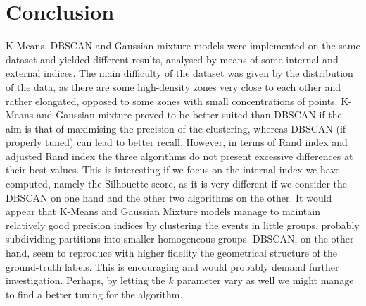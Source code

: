 \documentclass[a4paper]{article}
\begin{document}
 	\section{Conclusion}
 	K-Means, DBSCAN and Gaussian mixture models were implemented on the same dataset and yielded different results, analysed by means of some internal and external indices. The main difficulty of the dataset was given by the distribution of the data, as there are some high-density zones very close to each other and rather elongated, opposed to some zones with small concentrations of points.  K-Means and Gaussian mixture proved to be better suited than DBSCAN if the aim is that of maximising the precision of the clustering, whereas DBSCAN (if properly tuned) can lead to better recall. However, in terms of Rand index and adjusted Rand index the three algorithms do not present excessive differences at their best values. This is interesting if we focus on the internal index we have computed, namely the Silhouette score, as it is very different if we consider the DBSCAN on one hand and the other two algorithms on the other. It would appear that K-Means and Gaussian Mixture models manage to maintain relatively good precision indices by clustering the events in little groups, probably subdividing partitions into smaller homogeneous groups. DBSCAN, on the other hand, seem to reproduce with higher fidelity the geometrical structure of the ground-truth labels. This is encouraging and would probably demand further investigation. Perhaps, by letting the $k$ parameter vary as well we might manage to find a better tuning for the algorithm.
	
	
\end{document}
